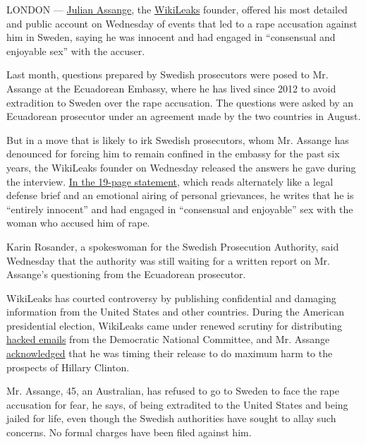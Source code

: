 LONDON ---
\href{http://topics.nytimes.com/top/reference/timestopics/people/a/julian_p_assange/index.html?inline=nyt-per}{Julian
Assange}, the
\href{http://topics.nytimes.com/top/reference/timestopics/organizations/w/wikileaks/index.html?inline=nyt-org}{WikiLeaks}
founder, offered his most detailed and public account on Wednesday of
events that led to a rape accusation against him in Sweden, saying he
was innocent and had engaged in ``consensual and enjoyable sex'' with
the accuser.

Last month, questions prepared by Swedish prosecutors were posed to Mr.
Assange at the Ecuadorean Embassy, where he has lived since 2012 to
avoid extradition to Sweden over the rape accusation. The questions were
asked by an Ecuadorean prosecutor under an agreement made by the two
countries in August.

But in a move that is likely to irk Swedish prosecutors, whom Mr.
Assange has denounced for forcing him to remain confined in the embassy
for the past six years, the WikiLeaks founder on Wednesday released the
answers he gave during the interview.
\href{https://justice4assange.com/IMG/html/assange-statement-2016.html}{In
the 19-page statement}, which reads alternately like a legal defense
brief and an emotional airing of personal grievances, he writes that he
is ``entirely innocent'' and had engaged in ``consensual and enjoyable''
sex with the woman who accused him of rape.

Karin Rosander, a spokeswoman for the Swedish Prosecution Authority,
said Wednesday that the authority was still waiting for a written report
on Mr. Assange's questioning from the Ecuadorean prosecutor.

WikiLeaks has courted controversy by publishing confidential and
damaging information from the United States and other countries. During
the American presidential election, WikiLeaks came under renewed
scrutiny for distributing
\href{http://www.nytimes.com/2016/10/08/us/politics/us-formally-accuses-russia-of-stealing-dnc-emails.html}{hacked
emails} from the Democratic National Committee, and Mr. Assange
\href{http://www.nytimes.com/2016/07/27/us/politics/assange-timed-wikileaks-release-of-democratic-emails-to-harm-hillary-clinton.html}{acknowledged}
that he was timing their release to do maximum harm to the prospects of
Hillary Clinton.

Mr. Assange, 45, an Australian, has refused to go to Sweden to face the
rape accusation for fear, he says, of being extradited to the United
States and being jailed for life, even though the Swedish authorities
have sought to allay such concerns. No formal charges have been filed
against him.

